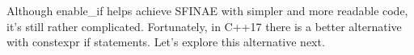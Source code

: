 Although enable\_if helps achieve SFINAE with simpler and more readable code, it’s still rather complicated. Fortunately, in C++17 there is a better alternative with constexpr if statements. Let’s explore this alternative next.


































